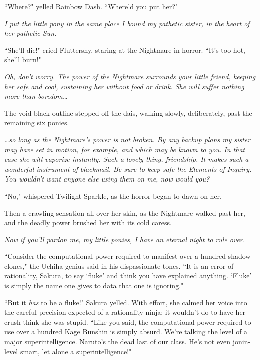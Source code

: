 ``Where?" yelled Rainbow Dash. ``Where'd you put her?"

\emph{I put the little pony in the same place I bound my pathetic sister, in the heart of her pathetic Sun.}

``She'll die!" cried Fluttershy, staring at the Nightmare in horror. ``It's too hot, she'll burn!"

\emph{Oh, don't worry. The power of the Nightmare surrounds your little friend, keeping her safe and cool, sustaining her without food or drink. She will suffer nothing more than boredom{\ldots}}

The void-black outline stepped off the dais, walking slowly, deliberately, past the remaining six ponies.

\emph{{\ldots}so long as the Nightmare's power is not broken. By any backup plans my sister may have set in motion, for example, and which may be known to you. In that case she will vaporize instantly. Such a lovely thing, friendship. It makes such a wonderful instrument of blackmail. Be sure to keep safe the Elements of Inquiry. You wouldn't want anyone else using them on me, now would you?}

``No," whispered Twilight Sparkle, as the horror began to dawn on her.

Then a crawling sensation all over her skin, as the Nightmare walked past her, and the deadly power brushed her with its cold caress.

\emph{Now if you'll pardon me, my little ponies, I have an eternal night to rule over.}

\clearpage
{}

``Consider the computational power required to manifest over a hundred shadow clones," the Uchiha genius said in his dispassionate tones. ``It is an error of rationality, Sakura, to say `fluke' and think you have explained anything. `Fluke' is simply the name one gives to data that one is ignoring."

``But it \emph{has} to be a fluke!" Sakura yelled. With effort, she calmed her voice into the careful precision expected of a rationality ninja; it wouldn't do to have her crush think she was stupid. ``Like you said, the computational power required to use over a hundred Kage Bunshin is simply absurd. We're talking the level of a major superintelligence. Naruto's the dead last of our class. He's not even jōnin-level smart, let alone a superintelligence!"

